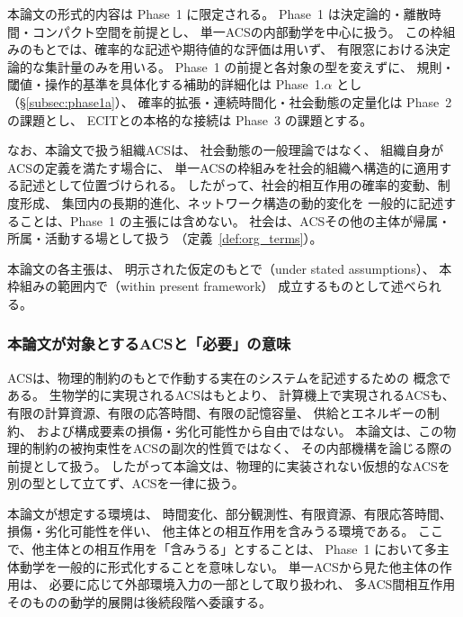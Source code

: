 本論文の形式的内容は Phase~1 に限定される。
Phase~1 は決定論的・離散時間・コンパクト空間を前提とし、
単一ACSの内部動学を中心に扱う。
この枠組みのもとでは、確率的な記述や期待値的な評価は用いず、
有限窓における決定論的な集計量のみを用いる。
Phase~1 の前提と各対象の型を変えずに、
規則・閾値・操作的基準を具体化する補助的詳細化は Phase~1.$\alpha$ とし
（\S\ref{subsec:phase1a}）、
確率的拡張・連続時間化・社会動態の定量化は Phase~2 の課題とし、
ECITとの本格的な接続は Phase~3 の課題とする。

なお、本論文で扱う組織ACSは、
社会動態の一般理論ではなく、
組織自身がACSの定義を満たす場合に、
単一ACSの枠組みを社会的組織へ構造的に適用する記述として位置づけられる。
したがって、社会的相互作用の確率的変動、制度形成、
集団内の長期的進化、ネットワーク構造の動的変化を
一般的に記述することは、Phase~1 の主張には含めない。
社会は、ACSその他の主体が帰属・所属・活動する場として扱う
（定義~\ref{def:org_terms}）。

本論文の各主張は、
明示された仮定のもとで（under stated assumptions）、
本枠組みの範囲内で（within present framework）
成立するものとして述べられる。

\subsubsection{本論文が対象とするACSと「必要」の意味}
\label{subsubsec:real_world_scope}

ACSは、物理的制約のもとで作動する実在のシステムを記述するための
概念である。
生物学的に実現されるACSはもとより、
計算機上で実現されるACSも、
有限の計算資源、有限の応答時間、有限の記憶容量、
供給とエネルギーの制約、
および構成要素の損傷・劣化可能性から自由ではない。
本論文は、この物理的制約の被拘束性をACSの副次的性質ではなく、
その内部機構を論じる際の前提として扱う。
したがって本論文は、物理的に実装されない仮想的なACSを
別の型として立てず、ACSを一律に扱う。

本論文が想定する環境は、
時間変化、部分観測性、有限資源、有限応答時間、
損傷・劣化可能性を伴い、
他主体との相互作用を含みうる環境である。
ここで、他主体との相互作用を「含みうる」とすることは、
Phase~1 において多主体動学を一般的に形式化することを意味しない。
単一ACSから見た他主体の作用は、
必要に応じて外部環境入力の一部として取り扱われ、
多ACS間相互作用そのものの動学的展開は後続段階へ委譲する。

